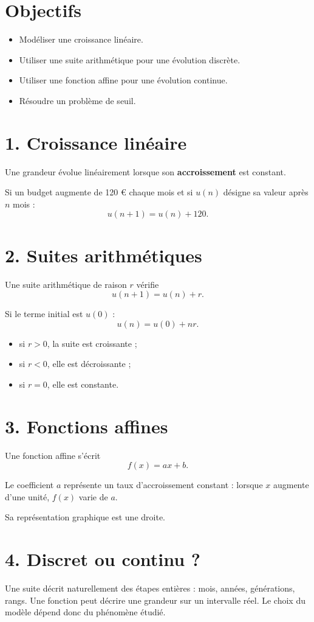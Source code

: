 \section{Objectifs}
\begin{itemize}
\item Modéliser une croissance linéaire.
\item Utiliser une suite arithmétique pour une évolution discrète.
\item Utiliser une fonction affine pour une évolution continue.
\item Résoudre un problème de seuil.
\end{itemize}

\section{1. Croissance linéaire}
Une grandeur évolue linéairement lorsque son \textbf{accroissement} est constant.

Si un budget augmente de 120 € chaque mois et si $u(n)$ désigne sa valeur après $n$ mois :
\[
u(n+1)=u(n)+120.
\]

\section{2. Suites arithmétiques}
Une suite arithmétique de raison $r$ vérifie
\[
u(n+1)=u(n)+r.
\]

Si le terme initial est $u(0)$ :
\[
u(n)=u(0)+nr.
\]

\begin{itemize}
\item si $r>0$, la suite est croissante ;
\item si $r<0$, elle est décroissante ;
\item si $r=0$, elle est constante.
\end{itemize}

\section{3. Fonctions affines}
Une fonction affine s'écrit
\[
f(x)=ax+b.
\]

Le coefficient $a$ représente un taux d'accroissement constant : lorsque $x$ augmente d'une unité, $f(x)$ varie de $a$.

Sa représentation graphique est une droite.

\section{4. Discret ou continu ?}
Une suite décrit naturellement des étapes entières : mois, années, générations, rangs. Une fonction peut décrire une grandeur sur un intervalle réel. Le choix du modèle dépend donc du phénomène étudié.

